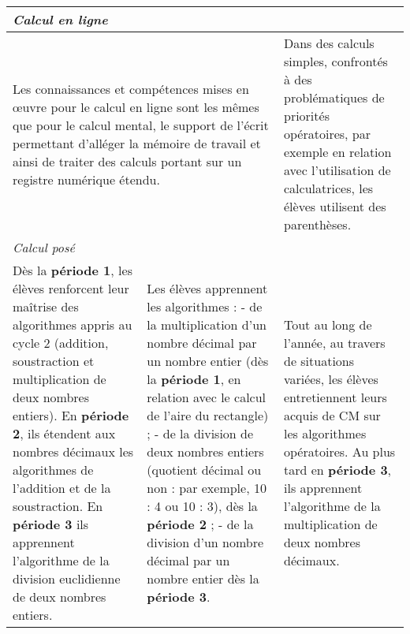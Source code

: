 \documentclass[11pt]{article}
\newcommand{\note}[1]{\hline\multicolumn{3}{|p{18.6cm}|}{#1} \\ \hline}
\newenvironment{programme}
{
    \setlength{\arrayrulewidth}{0.5pt}
    \arrayrulecolor{or}
    \begin{center}
    \begin{tabular}{|p{6.4cm}|p{6.4cm}|p{6.4cm}|}
}
{
    \hline
    \end{tabular}
    \end{center}
}
\begin{document}
\begin{programme}
    \note{\textit{Calcul en ligne}} 
    \multicolumn{2}{|p{12.4cm}|}{Les connaissances et compétences mises en œuvre pour le calcul en ligne sont les mêmes que pour le calcul mental, le support de l’écrit permettant d’alléger la mémoire de travail et ainsi de traiter des calculs portant sur un registre numérique étendu.} & Dans des calculs simples, confrontés à des problématiques de priorités opératoires, par exemple en relation avec l’utilisation de calculatrices, les élèves utilisent des parenthèses. \\
    \note{\textit{Calcul posé}} 
    Dès la \textbf{période 1}, les élèves renforcent leur maîtrise des algorithmes appris au cycle 2 (addition, soustraction et multiplication de deux nombres entiers). En \textbf{période 2}, ils étendent aux nombres décimaux les algorithmes de l’addition et de la soustraction. En \textbf{période 3} ils apprennent l’algorithme de la division euclidienne de deux nombres entiers. & Les élèves apprennent les algorithmes : - de la multiplication d’un nombre décimal par un nombre entier (dès la \textbf{période 1}, en relation avec le calcul de l’aire du rectangle) ; - de la division de deux nombres entiers (quotient décimal ou non : par exemple, 10 : 4 ou 10 : 3), dès la \textbf{période 2} ; - de la division d’un nombre décimal par un nombre entier dès la \textbf{période 3}. & Tout au long de l’année, au travers de situations variées, les élèves entretiennent leurs acquis de CM sur les algorithmes opératoires. Au plus tard en \textbf{période 3}, ils apprennent l’algorithme de la multiplication de deux nombres décimaux. \\
\end{programme}
\end{document}
